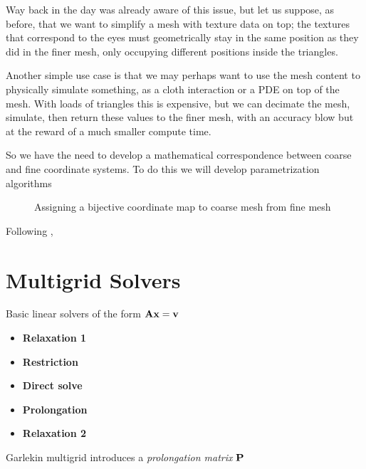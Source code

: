 Way back in the day \cite{LOD2} was already aware of this issue,
but let us suppose, as before, that we want to simplify a mesh with
texture data on top; the textures that correspond to the eyes must
geometrically stay in the same position as they did in the finer mesh,
only occupying different positions inside the triangles.

\spa

Another simple use case is that we may perhaps want to use the mesh
content to physically simulate something, as a cloth interaction
or a PDE on top of the mesh. With loads of triangles this is expensive,
but we can decimate the mesh, simulate, then return these values to the
finer mesh, with an accuracy blow but at the reward of a much smaller
compute time.

\spa

So we have the need to develop a mathematical correspondence between
coarse and fine coordinate systems. To do this we will develop
parametrization algorithms

\begin{figure}[h]
    \centering
    \caption{Assigning a bijective coordinate map to coarse mesh
    from fine mesh}
\end{figure}

Following \cite{param1} \cite{param2},

\section{Multigrid Solvers}

Basic linear solvers of the form $\bf{Ax = v}$

\begin{itemize}
    \item \textbf{Relaxation 1}
    \item \textbf{Restriction}
    \item \textbf{Direct solve}
    \item \textbf{Prolongation}
    \item \textbf{Relaxation 2}
\end{itemize}

Garlekin multigrid introduces a \emph{prolongation matrix} $\bf{P}$
